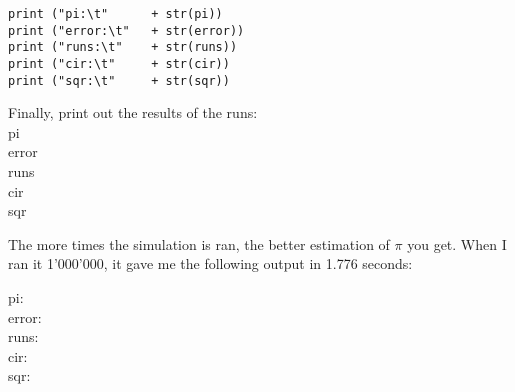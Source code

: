 \documentclass{article}
\begin{document}
\begin{mdframed}
\begin{lstlisting}
print ("pi:\t"      + str(pi))
print ("error:\t"   + str(error))
print ("runs:\t"    + str(runs))
print ("cir:\t"     + str(cir))
print ("sqr:\t"     + str(sqr))
\end{lstlisting}
\end{mdframed}
Finally, print out the results of the runs: \\
pi	 \\
error	 \\
runs	 \\
cir	 \\
sqr 	 \\

\hfill

The more times the simulation is ran, the better estimation of $\pi$ you get.
When I ran it 1'000'000, it gave me the following output in 1.776 seconds: \\
\begin{mdframed}
pi:	\\
error:	\\
runs:	\\
cir:	\\
sqr:	\\
\end{mdframed}
\end{document}
